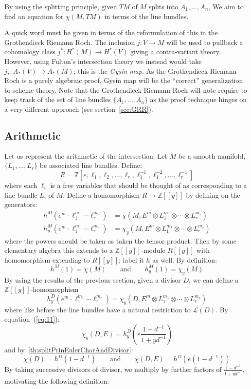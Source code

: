 \documentclass{book}
\newcommand{\Z}{{\mathbb{Z}}}
\newcommand{\CL}{{\mathcal{L}}}
\begin{document}
By using the splitting principle, given $TM$ of $M$ splits into $A_1, ..., A_n$, We aim to find an equation
for $\chi(M, TM)$ in terms of the line bundles.

A quick word must be given in terms of the reformulation of this in the Grothendieck Riemann Roch. The
inclusion $j: V \to M$ will be used to pullback a cohomology class $j^*: H^*(M) \to H^*(V)$ giving
a contra-variant theory. However, using Fulton's intersection theory we instead would take $j_*: A_*(V) \to
A_*(M)$; this is the \emph{Gysin map}. As the Grothendieck Riemann Roch is a purely algebraic proof, Gysin map
will be the ``correct'' generalization to scheme theory. Note that the Grothendieck Riemann Roch will note
require to keep track of the set of line bundles $\{A_1, ..., A_n\}$ as the proof technique hinges on
a very different approach (see section~\ref{sec:GRR}).

%

\subsection{Arithmetic}

Let us represent the arithmetic of the intersection. Let $M$ be a smooth manifold, $\{L_1, ..., L_r\}$ be
associated line bundles. Define:
\[
  R = \Z[e, \ell_1, \ell_2, ..., \ell_r, \ell_1^{-1}, \ell_1^{-2}, ...,\ell_r^{-1}]
\]
where each $\ell_i$ is a free variables that should be thought of as corresponding to a line bundle $L_i$ of
$M$. Define a homomorphism $R \to \Z[[y]]$ by defining on the generators:
\begin{align*}
  h^M(e^{m}\cdot \ell_1^{m_1}\cdots \ell_r^{m_r}) &= \chi(M, E^{m} \otimes L_1^{m_1}\otimes \cdots \otimes L_r^{m_r})\\
  h_y^M(e^{m}\cdot \ell_1^{m_1}\cdots \ell_r^{m_r}) &= \chi_y(M, E^{m} \otimes L_1^{m_1}\otimes \cdots \otimes L_r^{m_r})
\end{align*}
where the powers should be taken as taken the tensor product. Then by some elementary algebra this extends to
a $\Z[[y]]$-module $R[[y]]$ with homomorphism extending to $R[[y]]$; label it $h$ as well. By definition:
\[
  h^M(1) = \chi(M) \qquad \text{and} \qquad h_y^M(1) = \chi_y(M)
\]
By using the results of the previous section, given a divisor $D$, we can define a $\Z[[y]]$-homomorphism
\[
  h_y^D(e^{m}\cdot \ell_1^{m_1}\cdots \ell_r^{m_r}) = \chi_y(D, E^{m} \otimes L_1^{m_1}\otimes \cdots \otimes
  L_r^{m_r})
\]
where like before the line bundles have a natural restriction to $\CL(D)$. By equation~(\ref{eq:11}):
\[
  \chi_y(D, E) = h_y^D \left(e\frac{1-d^{-1}}{1+yd^{-1}}\right)
\]
and by~\cref{th:splitPrinEulerCharAndDivisor}:
\[
  \chi(D) = h^D(1-d^{-1}) \qquad \text{and} \qquad \chi(D, E) = h^D(e(1- d^{-1}))
\]
By taking successive divisors of divisor, we multiply by further factors of $\frac{1-d^{-1}}{1+yd^{-1}}$,
motivating the following definition:
\end{document}
